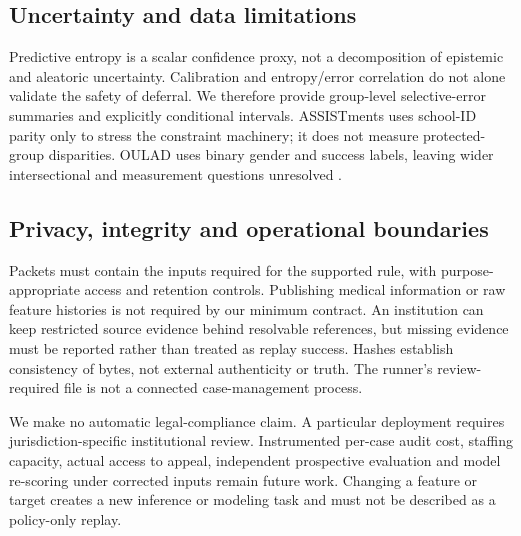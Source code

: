 \subsection{Uncertainty and data limitations}
Predictive entropy is a scalar confidence proxy, not a decomposition of epistemic and aleatoric uncertainty. Calibration and entropy/error correlation do not alone validate the safety of deferral. We therefore provide group-level selective-error summaries and explicitly conditional intervals. ASSISTments uses school-ID parity only to stress the constraint machinery; it does not measure protected-group disparities. OULAD uses binary gender and success labels, leaving wider intersectional and measurement questions unresolved \cite{BakerHawn2022AlgorithmicBiasEducation}.

\subsection{Privacy, integrity and operational boundaries}
Packets must contain the inputs required for the supported rule, with purpose-appropriate access and retention controls. Publishing medical information or raw feature histories is not required by our minimum contract. An institution can keep restricted source evidence behind resolvable references, but missing evidence must be reported rather than treated as replay success. Hashes establish consistency of bytes, not external authenticity or truth. The runner's review-required file is not a connected case-management process.

We make no automatic legal-compliance claim. A particular deployment requires jurisdiction-specific institutional review. Instrumented per-case audit cost, staffing capacity, actual access to appeal, independent prospective evaluation and model re-scoring under corrected inputs remain future work. Changing a feature or target creates a new inference or modeling task and must not be described as a policy-only replay.
